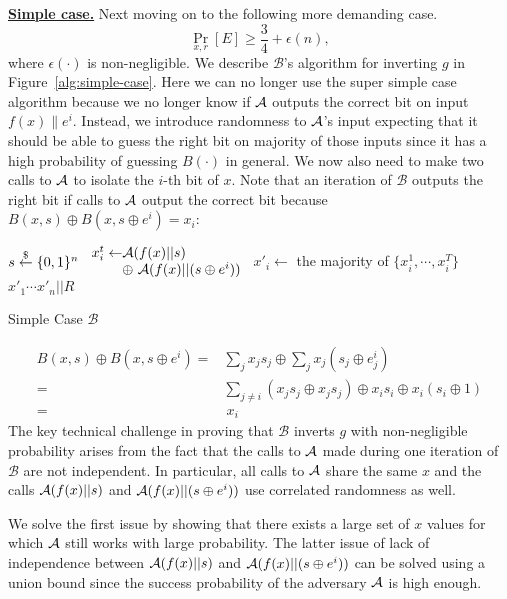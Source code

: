 \bigskip
\noindent\textbf{\underline{Simple case.}}
Next moving on to the following more demanding case.
$$\Pr_{x,r}[E] \geq \frac{3}{4} + \epsilon(n),$$ where $\epsilon(\cdot)$ is non-negligible.
We describe $\mathcal{B}$'s algorithm for inverting $g$ in Figure~\ref{alg:simple-case}.
Here we can no longer use the super simple case algorithm because we no longer know if $\mathcal{A}$ outputs the correct bit on input $f(x) \| e^i$.
Instead, we introduce randomness to $\mathcal{A}$'s input expecting that it should be able to guess the right bit on majority of those inputs since it has a high probability of guessing $B(\cdot)$ in general.
We now also need to make two calls to $\mathcal{A}$ to isolate the $i$-th bit of $x$.
Note that an iteration of $\mathcal{B}$ outputs the right bit if calls to $\mathcal{A}$ output the correct bit because $B(x,s) \oplus B(x, s\oplus e^i) = x_i$:
\begin{marginfigure}
\begin{algorithmic}
		\State $s \stackrel{\$}{\leftarrow} \{0,1\}^{n}$
		\State $\begin{array}{l@{}l}
		x_i^t \leftarrow& \ma(f(x)|| s) \\
		& \oplus~ \ma(f(x) || (s\oplus e^i))
		\end{array}$
	\EndFor
	\State $x'_i \gets $ the majority of $\{x_i^1, \cdots, x_i^T\}$
\EndFor
\State \Return $x'_1\cdots x'_n||R$
\end{algorithmic}
\caption{Simple Case $\mathcal{B}$} \label{alg:simple-case}
\end{marginfigure}
\begin{align*}
B(x,s) \oplus B(x, s\oplus e^i) =& \sum_j x_j s_j \oplus \sum_j x_j (s_j \oplus e^i_j)\\
=& \sum_{j \not= i} (x_j s_j \oplus x_j s_j) \oplus x_i s_i \oplus x_i (s_i \oplus 1)\\
=& ~x_i
\end{align*}
The key technical challenge in proving that $\mathcal{B}$ inverts $g$ with non-negligible probability arises from the fact that the calls to $\mathcal{A}$ made during one iteration of $\mathcal{B}$ are not independent.
In particular, all calls to $\mathcal{A}$ share the same $x$ and the calls $\mathcal{A}(f(x)|| s)$ and $\mathcal{A}(f(x) || (s \oplus e^i))$ use correlated randomness as well.

We solve the first issue by showing that there exists a large set of $x$ values for which $\mathcal{A}$ still works with large probability.
The latter issue of lack of independence between $\mathcal{A}(f(x)|| s)$ and $\mathcal{A}(f(x) || (s \oplus e^i))$ can be solved using a union bound since the success probability of the adversary $\mathcal{A}$ is high enough.

